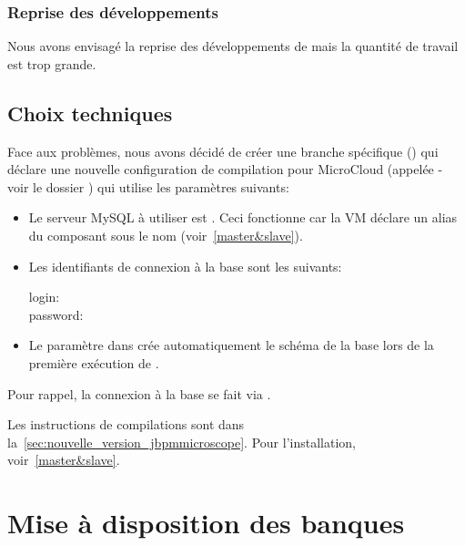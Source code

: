 \subsubsection{Reprise des développements}

Nous avons envisagé la reprise des développements de  mais la quantité de travail est trop grande.

\subsection{Choix techniques}

Face aux problèmes, nous avons décidé de créer une branche spécifique ()
qui déclare une nouvelle configuration de compilation pour MicroCloud (appelée  - voir le dossier )
qui utilise les paramètres suivants:
\begin{itemize}
    \item Le serveur MySQL à utiliser est .
          Ceci fonctionne car la VM  déclare un alias du composant  sous le nom 
          (voir~\autoref{master&slave}).
    \item Les identifiants de connexion à la base  sont les suivants:
          \begin{description}
              \item[login:] 
              \item[password:] 
          \end{description}
    \item Le paramètre  dans  crée automatiquement le schéma de la base  lors de la première exécution de .
\end{itemize}\vspace*{\baselineskip}

Pour rappel, la connexion à la base se fait via .

Les instructions de compilations sont dans la~\autoref{sec:nouvelle_version_jbpmmicroscope}.
Pour l'installation, voir~\autoref{master&slave}.

\section{Mise à disposition des banques} \label{sec:acces_banques}

